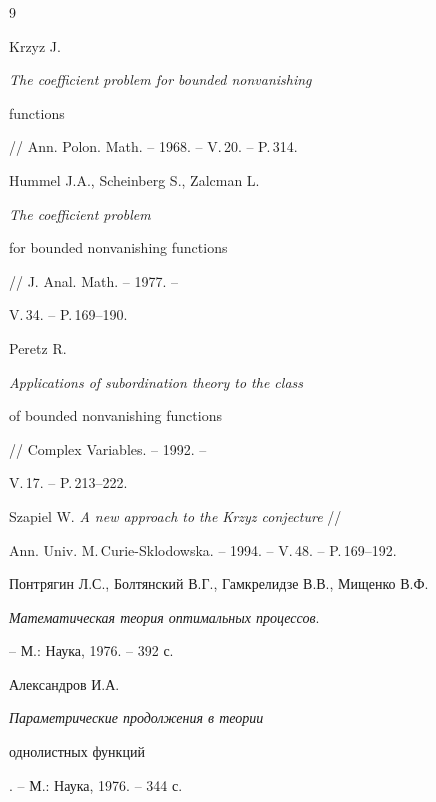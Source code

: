 \begin{thebibliography}{9} 


 


\bibitem{} 


Krzyz J. {\em The coefficient problem for bounded nonvanishing 


functions} // Ann. Polon. Math. -- 1968. -- V.\,20. -- P.\,314. 




Hummel J.A., Scheinberg S., Zalcman L. {\em The coefficient problem 


for bounded nonvanishing functions} // J. Anal. Math. -- 1977. -- 


V.\,34. -- P.\,169--190. 




Peretz R. {\em Applications of subordination theory to the class 


of bounded nonvanishing functions} // Complex Variables. -- 1992. -- 


V.\,17. -- P.\,213--222. 




Szapiel W. {\em A new approach to the Krzyz conjecture} // 


Ann. Univ. M.\,Curie-Sklodowska. -- 1994. -- V.\,48. -- P.\,169--192. 




Понтрягин Л.С., Болтянский В.Г., Гамкрелидзе В.В., Мищенко В.Ф. 


{\em Математическая теория оптимальных процессов}.


-- М.: Наука, 1976. -- 392 с. 




Александров И.А. {\em Параметрические продолжения в теории 


однолистных функций}. -- М.: Наука, 1976. -- 344 с. 


 


\end{thebibliography} 


 


\vskip 2cm 


 








 


\label{end} 


 


